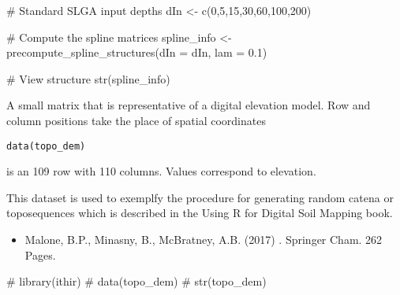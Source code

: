 \documentclass[a4paper]{book}
\begin{document}
%
\begin{Examples}
\begin{ExampleCode}
# Standard SLGA input depths
dIn <- c(0,5,15,30,60,100,200)

# Compute the spline matrices
spline_info <- precompute_spline_structures(dIn = dIn, lam = 0.1)

# View structure
str(spline_info)
\end{ExampleCode}
\end{Examples}
%
\begin{Description}
A small matrix that is representative of a digital elevation model. Row and column positions take the place of spatial coordinates
\end{Description}
%
\begin{Usage}
\begin{verbatim}
data(topo_dem)
\end{verbatim}
\end{Usage}
%
\begin{Format}
 is an 109 row  with 110 columns. Values correspond to elevation. 
\end{Format}
%
\begin{Details}
This dataset is used to exemplfy the procedure for generating random catena or toposequences which is described in the Using R for Digital Soil Mapping book.
\end{Details}
%
\begin{References}
\begin{itemize}

\item{} Malone, B.P., Minasny, B., McBratney, A.B. (2017) . Springer Cham. 262 Pages.

\end{itemize}

\end{References}
%
\begin{Examples}
\begin{ExampleCode}

# library(ithir)
# data(topo_dem)
# str(topo_dem)

\end{ExampleCode}
\end{Examples}
\end{document}
